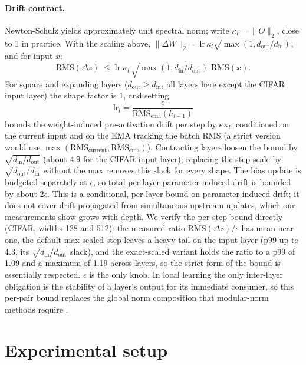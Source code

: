 \documentclass[11pt]{article}
\newcommand{\eps}{\epsilon}
\begin{document}
\paragraph{Drift contract.} Newton-Schulz yields approximately unit spectral norm; write $\kappa_l = \lVert O \rVert_2$, close to 1 in practice. With the scaling above, $\lVert \Delta W \rVert_2 = \mathrm{lr}\, \kappa_l \sqrt{\max(1, d_{\text{out}}/d_{\text{in}})}$, and for input $x$:
\begin{equation}
\mathrm{RMS}(\Delta z) \;\le\; \mathrm{lr}\; \kappa_l\, \sqrt{\max(1, d_{\text{in}}/d_{\text{out}})}\; \mathrm{RMS}(x).
\end{equation}
For square and expanding layers ($d_{\text{out}} \ge d_{\text{in}}$, all layers here except the CIFAR input layer) the shape factor is 1, and setting
\begin{equation}
\mathrm{lr}_l = \frac{\eps}{\mathrm{RMS}_{\mathrm{ema}}(h_{l-1})}
\end{equation}
bounds the weight-induced pre-activation drift per step by $\eps\,\kappa_l$, conditioned on the current input and on the EMA tracking the batch RMS (a strict version would use $\max(\mathrm{RMS}_{\text{current}}, \mathrm{RMS}_{\mathrm{ema}})$). Contracting layers loosen the bound by $\sqrt{d_{\text{in}}/d_{\text{out}}}$ (about 4.9 for the CIFAR input layer); replacing the step scale by $\sqrt{d_{\text{out}}/d_{\text{in}}}$ without the max removes this slack for every shape. The bias update is budgeted separately at $\eps$, so total per-layer parameter-induced drift is bounded by about $2\eps$. This is a conditional, per-layer bound on parameter-induced drift; it does not cover drift propagated from simultaneous upstream updates, which our measurements show grows with depth. We verify the per-step bound directly (CIFAR, widths 128 and 512): the measured ratio $\mathrm{RMS}(\Delta z)/\eps$ has mean near one, the default max-scaled step leaves a heavy tail on the input layer (p99 up to 4.3, its $\sqrt{d_{\text{in}}/d_{\text{out}}}$ slack), and the exact-scaled variant holds the ratio to a p99 of 1.09 and a maximum of 1.19 across layers, so the strict form of the bound is essentially respected. $\eps$ is the only knob. In local learning the only inter-layer obligation is the stability of a layer's output for its immediate consumer, so this per-pair bound replaces the global norm composition that modular-norm methods require \citep{large2024modular}.

\section{Experimental setup}
\end{document}
